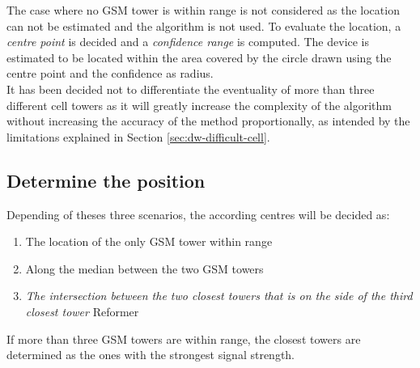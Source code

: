 The case where no GSM tower is within range is not considered as the location can not be estimated and the algorithm is not used.
To evaluate the location, a \emph{centre point} is decided and a \emph{confidence range} is computed.
The device is estimated to be located within the area covered by the circle drawn using the centre point and the confidence as radius.\\

It has been decided not to differentiate the eventuality of more than three different cell towers as it will greatly increase the complexity of the algorithm without increasing the accuracy of the method proportionally, as intended by the limitations explained in Section \ref{sec:dw-difficult-cell}.

\subsection{Determine the position}

Depending of theses three scenarios, the according centres will be decided as:

\begin{enumerate}
\item The location of the only GSM tower within range
\item Along the median between the two GSM towers
\item \emph{The intersection between the two closest towers that is on the side of the third closest tower} Reformer
\end{enumerate}

If more than three GSM towers are within range, the closest towers are determined as the ones with the strongest signal strength.\\


